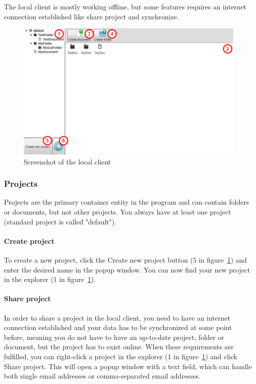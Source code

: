 The local client is mostly working offline, but some features requires an internet connection established like share project and synchronize.

\begin{figure}[htb]
	\centering
	\includegraphics[width=1\textwidth]{User_manual/graphics/local.png}
	\caption{Screenshot of the local client}
	\label{fig:manual-local}
\end{figure}

\subsubsection{Projects}
Projects are the primary container entity in the program and can contain folders or documents, but not other projects. You always have at least one project (standard project is called "default").

	\paragraph{Create project}
	To create a new project, click the Create new project button (5 in figure~\ref{fig:manual-local}) and enter the desired name in the popup window. You can now find your new project in the explorer (1 in figure~\ref{fig:manual-local}).

	\paragraph{Share project}
	In order to share a project in the local client, you need to have an internet connection established and your data has to be synchronized at some point before, meaning you do not have to have an up-to-date project, folder or document, but the project has to exist online. When these requirements are fulfilled, you can right-click a project in the explorer (1 in figure~\ref{fig:manual-local}) and click Share project. This will open a popup window with a text field, which can handle both single email addresses or comma-separated email addresses.

